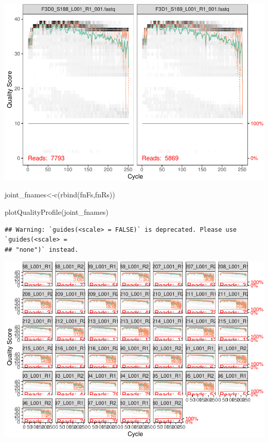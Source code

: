 \documentclass[
]{book}
\newenvironment{Shaded}{\begin{snugshade}}{\end{snugshade}}
\newcommand{\FunctionTok}[1]{\textcolor[rgb]{0.00,0.00,0.00}{#1}}
\newcommand{\NormalTok}[1]{#1}
\newcommand{\OtherTok}[1]{\textcolor[rgb]{0.56,0.35,0.01}{#1}}
\begin{document}
\includegraphics{16sworkshop_files/figure-latex/make_plots-1.pdf}

\begin{Shaded}
\begin{Highlighting}[]
\NormalTok{joint\_fnames}\OtherTok{\textless{}{-}}\FunctionTok{c}\NormalTok{(}\FunctionTok{rbind}\NormalTok{(fnFs,fnRs))}

\FunctionTok{plotQualityProfile}\NormalTok{(joint\_fnames)}
\end{Highlighting}
\end{Shaded}

\begin{verbatim}
## Warning: `guides(<scale> = FALSE)` is deprecated. Please use `guides(<scale> =
## "none")` instead.
\end{verbatim}

\includegraphics{16sworkshop_files/figure-latex/make_plots-2.pdf}
\end{document}
